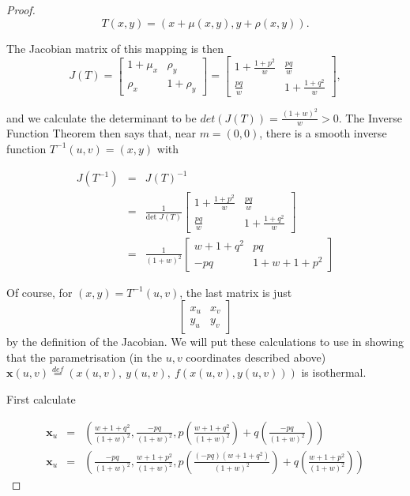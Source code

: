 \begin{proof}
\begin{displaymath}
T(x,y) = (x+\mu(x,y),y+\rho(x,y)).
\end{displaymath}

The Jacobian matrix of this mapping is then
\begin{displaymath}
J(T)= \left[ \begin{array}{cc}
1+\mu_x & \rho_y \\
\rho_x & 1+\rho_y
\end{array} \right] = \left[ \begin{array}{cc}
1+\frac{1+p^2}{w} & \frac{pq}{w} \\
\frac{pq}{w} & 1+ \frac{1+q^2}{w}
\end{array} \right],
\end{displaymath}

and we calculate the determinant to be $det(J(T)) = \frac{(1+w)^2}{w} > 0$. The Inverse Function Theorem then says that, near $m=(0,0)$, there is a smooth inverse function $T^{-1}(u,v)=(x,y)$ with

\begin{eqnarray}
\nonumber
J(T^{-1})&=&J(T)^{-1} \\
\nonumber
&=&\frac{1}{\mbox{det }J(T)}\left[ \begin{array}{cc}
1+\frac{1+p^2}{w} & \frac{pq}{w} \\
\frac{pq}{w} & 1+ \frac{1+q^2}{w}
\end{array} \right] \\
\nonumber
&=&\frac{1}{(1+w)^2}\left[ \begin{array}{cc}
w+1+q^2 & pq \\
-pq & 1+ w+1+p^2
\end{array} \right]
\end{eqnarray}

Of course, for $(x,y) = T^{-1}(u,v)$, the last matrix is just
\begin{displaymath}
\left[ \begin{array}{cc}
x_u & x_v \\
y_u & y_v
\end{array} \right]
\end{displaymath}
by the definition of the Jacobian. We will put these calculations to use in showing that the parametrisation (in the $u,v$ coordinates described above) $\mathbf x(u,v) \stackrel{def}{=}(x(u,v),\ y(u,v),\ f(x(u,v),y(u,v)))$ is isothermal.

First calculate

\begin{eqnarray}
\nonumber
\mathbf x_u &=& \left(\frac{w+1+q^2}{(1+w)^2},\frac{-pq}{(1+w)^2},p\left(\frac{w+1+q^2}{(1+w)^2}\right)+q\left(\frac{-pq}{(1+w)^2}\right)\right) \\
\nonumber
\mathbf x_u &=& \left(\frac{-pq}{(1+w)^2},\frac{w+1+p^2}{(1+w)^2},p\left(\frac{(-pq)(w+1+q^2)}{(1+w)^2}\right)+q\left(\frac{w+1+p^2}{(1+w)^2}\right)\right)
\end{eqnarray}


\end{proof}
